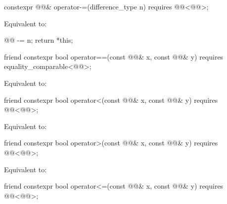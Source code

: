 %
\begin{itemdecl}
constexpr @@& operator-=(difference_type n)
  requires @@<@@>;
\end{itemdecl}

\begin{itemdescr}
\pnum
\effects
Equivalent to:
\begin{codeblock}
@@ -= n;
return *this;
\end{codeblock}
\end{itemdescr}

%
\begin{itemdecl}
friend constexpr bool operator==(const @@& x, const @@& y)
  requires equality_comparable<@@>;
\end{itemdecl}

\begin{itemdescr}
\pnum
\effects
Equivalent to: 
\end{itemdescr}

%
\begin{itemdecl}
friend constexpr bool operator<(const @@& x, const @@& y)
  requires @@<@@>;
\end{itemdecl}

\begin{itemdescr}
\pnum
\effects
Equivalent to: 
\end{itemdescr}

%
\begin{itemdecl}
friend constexpr bool operator>(const @@& x, const @@& y)
  requires @@<@@>;
\end{itemdecl}

\begin{itemdescr}
\pnum
\effects
Equivalent to: 
\end{itemdescr}

%
\begin{itemdecl}
friend constexpr bool operator<=(const @@& x, const @@& y)
  requires @@<@@>;
\end{itemdecl}


